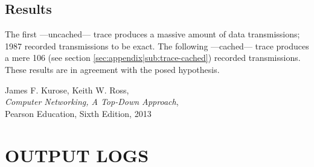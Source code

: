 \documentclass{acm_proc_article-sp}
\newcommand{\secref}[1]{(see section \ref{#1})}
\begin{document}
\subsection{Results}
\label{sec:http-protocol|sub:results}
The first ---uncached--- trace produces a massive amount of data
transmissions; 1987 recorded transmissions to be exact. The following
---cached--- trace produces a mere 106 \secref{sec:appendix|sub:trace-cached}
recorded transmissions. These results are in agreement with the posed
hypothesis.

%

%


%

\begin{thebibliography}{9}
    
        James F. Kurose, Keith W. Ross,\\
        \emph{Computer Networking, A Top-Down Approach},\\
        Pearson Education, Sixth Edition, 2013
    
\end{thebibliography}

%
%
\balancecolumns
\onecolumn
\appendix

\section{OUTPUT LOGS}
\end{document}
